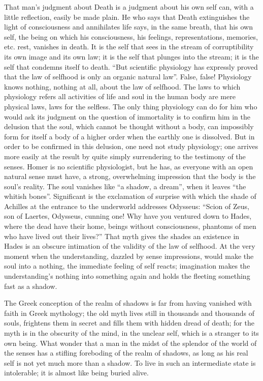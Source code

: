 \documentclass[12pt,a4paper,openany]{book}
\newcommand{\opage}[1]{\marginnote{\footnotesize\textit{[#1]}}}
\begin{document}
That man's judgment about Death is a judgment about his
own self can, with a little reflection, easily be made plain.
He who says that Death extinguishes the light of consciousness and
annihilates life says, in the same breath, that his
own self, the being on which his consciousness, his
feelings, representations, memories, etc. rest, vanishes
in death. It is the self that sees in the
stream of corruptibility its own image and its own law; it is
the self that plunges into the stream; it is the self that condemns
itself to death. ``But scientific physiology
has expressly proved that the law of selfhood is only
an organic natural law''. False, false! Physiology knows
nothing, nothing at all, about the law of selfhood. The laws to which
physiology refers all activities of life and soul
in the human body are mere physical laws,
laws for the selfless. The only thing physiology can
\setcounter{footnote}{0}%
\opage{197}do for him who would ask its judgment on the question of immortality
is to confirm him in the delusion that the
soul, which cannot be thought without a body, can impossibly
form for itself a body of a higher order when the earthly one
is dissolved. But in order to be confirmed in this delusion,
one need not study physiology; one arrives more easily at the result
by quite simply surrendering to the testimony of the senses.
Homer is no scientific physiologist, but he has, as everyone with an open natural sense
must have, a strong, overwhelming impression that
the body is the soul's reality. The soul vanishes like
``a shadow, a dream'', when it leaves ``the whitish
bones''. Significant is the exclamation of surprise
with which the shade of Achilles at the entrance to the underworld
addresses Odysseus: ``Scion of Zeus, son of Laertes, Odysseus,
cunning one! Why have you ventured down to Hades, where
the dead have their home, beings without consciousness, phantoms of
men who have lived out their lives?'' That myth gives the shades
an existence in Hades is an obscure intimation of the
validity of the law of selfhood. At the very moment when the understanding, dazzled
by sense impressions, would make the soul into a nothing,
the immediate feeling of self reacts; imagination makes
the understanding's nothing into something again and holds the fleeting
something fast as a shadow.

The Greek conception of the realm of shadows is far from
having vanished with faith in Greek mythology;
the old myth lives still in thousands and thousands of souls,
frightens them in secret and fills them with hidden dread
of death; for the myth is in the obscurity of the mind, in the unclear
self, which is a stranger to its own being. What wonder
that a man in the midst of the splendor of the world of the senses has a
stifling foreboding of the realm of shadows, as long as his
\setcounter{footnote}{0}%
\opage{198}real self is not yet much more than a shadow.
To live in such an intermediate state is intolerable; it is
almost like being buried alive.
\end{document}
